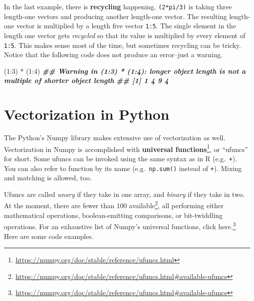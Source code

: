 \documentclass[
  12pt,
  krantz2]{krantz}
\makeatletter
\newenvironment{Shaded}{\begin{snugshade}}{\end{snugshade}}
\newcommand{\DecValTok}[1]{\textcolor[rgb]{0.06,0.06,0.06}{#1}}
\newcommand{\DocumentationTok}[1]{\textcolor[rgb]{0.37,0.37,0.37}{\textbf{\textit{#1}}}}
\newcommand{\NormalTok}[1]{#1}
\newcommand{\SpecialCharTok}[1]{\textcolor[rgb]{0,0,0}{#1}}
\renewcommand{\href}[2]{#2\footnote{\url{#1}}}
\newenvironment{kframe}{%
\medskip{}
\setlength{\fboxsep}{.8em}
 \def\at@end@of@kframe{}%
 \ifinner\ifhmode%
  \def\at@end@of@kframe{\end{minipage}}%
  \begin{minipage}{\columnwidth}%
 \fi\fi%
 \def\FrameCommand##1{\hskip\@totalleftmargin \hskip-\fboxsep
 \colorbox{shadecolor}{##1}\hskip-\fboxsep
     \hskip-\linewidth \hskip-\@totalleftmargin \hskip\columnwidth}%
 \MakeFramed {\advance\hsize-\width
   \@totalleftmargin\z@ \linewidth\hsize
   \@setminipage}}%
 {\par\unskip\endMakeFramed%
 \at@end@of@kframe}
\renewenvironment{Shaded}{\begin{kframe}}{\end{kframe}}
\makeatother
\begin{document}
In the last example, there is \textbf{recycling} happening. \texttt{(2*pi/3)} is taking three length-one vectors and producing another length-one vector. The resulting length-one vector is multiplied by a length five vector \texttt{1:5}. The single element in the length one vector gets \emph{recycled} so that its value is multiplied by every element of \texttt{1:5}.
This makes sense most of the time, but sometimes recycling can be tricky. Notice that the following code does not produce an error--just a warning.

\begin{Shaded}
\begin{Highlighting}[]
\NormalTok{(}\DecValTok{1}\SpecialCharTok{:}\DecValTok{3}\NormalTok{) }\SpecialCharTok{*}\NormalTok{ (}\DecValTok{1}\SpecialCharTok{:}\DecValTok{4}\NormalTok{)}
\DocumentationTok{\#\# Warning in (1:3) * (1:4): longer object length is not a multiple of shorter object length}
\DocumentationTok{\#\# [1] 1 4 9 4}
\end{Highlighting}
\end{Shaded}

\hypertarget{vectorization-in-python}{%
\section{Vectorization in Python}\label{vectorization-in-python}}

The Python's Numpy library makes extensive use of vectorization as well. Vectorization in Numpy is accomplished with \href{https://numpy.org/doc/stable/reference/ufuncs.html}{\textbf{universal functions}}, or ``ufuncs'' for short. Some ufuncs can be invoked using the same syntax as in R (e.g.~\texttt{+}). You can also refer to function by its name (e.g.~\texttt{np.sum()} instead of \texttt{+}). Mixing and matching is allowed, too.

Ufuncs are called \emph{unary} if they take in one array, and \emph{binary} if they take in two. At the moment, there are \href{https://numpy.org/doc/stable/reference/ufuncs.html\#available-ufuncs}{fewer than \(100\) available}, all performing either mathematical operations, boolean-emitting comparisons, or bit-twiddling operations. For an exhaustive list of Numpy's universal functions, \href{https://numpy.org/doc/stable/reference/ufuncs.html\#available-ufuncs}{click here.} Here are some code examples.
\end{document}
